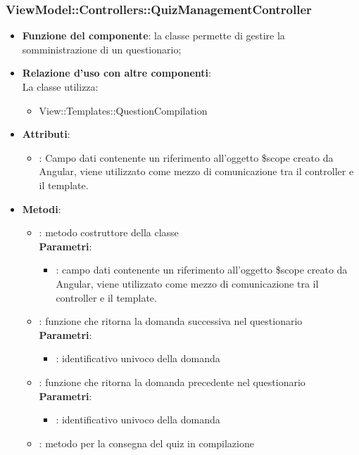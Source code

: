 \subsubsection{ViewModel::Controllers::QuizManagementController}
\begin{itemize}
\item\textbf{Funzione del componente}: la classe permette di gestire la somministrazione di un questionario;
	\item\textbf{Relazione d'uso con altre componenti}: \\
La classe utilizza:
	\begin{itemize}
		\item View::Templates::QuestionCompilation
	\end{itemize}
\item\textbf{Attributi}:
	\begin{itemize}
		\item{}: Campo dati contenente un riferimento all’oggetto \$scope creato da Angular, viene utilizzato come mezzo di comunicazione tra il controller e il template.\\
	\end{itemize}
\item\textbf{Metodi}:
	\begin{itemize}
		\item{}: metodo costruttore della classe\\
		\textbf{Parametri}:
			\begin{itemize}
				\item{}: campo dati contenente un riferimento all'oggetto \$scope creato da Angular, viene utilizzato come mezzo di comunicazione tra il controller e il template.\\
			\end{itemize}
		\item{}: funzione che ritorna la domanda successiva nel questionario\\
		\textbf{Parametri}:
			\begin{itemize}
				\item{}: identificativo univoco della domanda\\
			\end{itemize}
		\item{}: funzione che ritorna la domanda precedente nel questionario\\
		\textbf{Parametri}:
			\begin{itemize}
				\item{}: identificativo univoco della domanda\\
			\end{itemize}
		\item{}: metodo per la consegna del quiz in compilazione\\
	\end{itemize}
\end{itemize}


